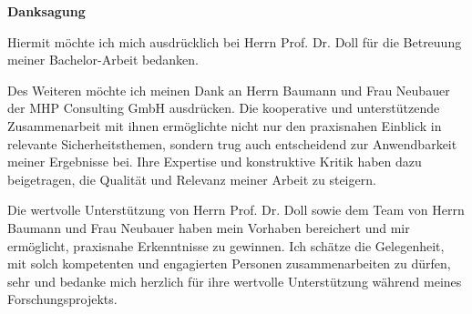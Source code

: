\vspace*{0.5cm}
\begin{center}
   \huge{\textbf{Danksagung}}
\end{center}

\thispagestyle{empty}
\vspace{3cm}

Hiermit möchte ich mich ausdrücklich bei Herrn Prof. Dr. Doll für die Betreuung meiner Bachelor-Arbeit bedanken. 

Des Weiteren möchte ich meinen Dank an Herrn Baumann und Frau Neubauer der MHP Consulting GmbH ausdrücken. Die kooperative und unterstützende Zusammenarbeit mit ihnen ermöglichte nicht nur den praxisnahen Einblick in relevante Sicherheitsthemen, sondern trug auch entscheidend zur Anwendbarkeit meiner Ergebnisse bei. Ihre Expertise und konstruktive Kritik haben dazu beigetragen, die Qualität und Relevanz meiner Arbeit zu steigern.

Die wertvolle Unterstützung von Herrn Prof. Dr. Doll sowie dem Team von Herrn Baumann und Frau Neubauer haben mein Vorhaben bereichert und mir ermöglicht, praxisnahe Erkenntnisse zu gewinnen. Ich schätze die Gelegenheit, mit solch kompetenten und engagierten Personen zusammenarbeiten zu dürfen, sehr und bedanke mich herzlich für ihre wertvolle Unterstützung während meines Forschungsprojekts.